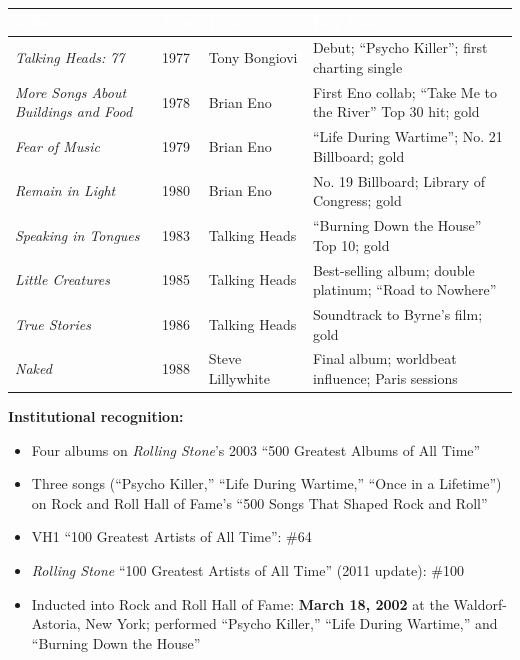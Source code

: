 \documentclass[11pt,letterpaper]{article}
\newcommand{\tableheader}[1]{\textbf{\sffamily\textcolor{white}{#1}}}
\begin{document}
\begin{center}
\begin{tabularx}{\textwidth}{L{4.2cm}C{1cm}L{3.5cm}X}
\toprule
{}
\tableheader{Album} & \tableheader{Year} & \tableheader{Producer(s)} & \tableheader{Key Notes} \\
\midrule
\textit{Talking Heads: 77} & 1977 & Tony Bongiovi & Debut; ``Psycho Killer''; first charting single \\
\textit{More Songs About Buildings and Food} & 1978 & Brian Eno & First Eno collab; ``Take Me to the River'' Top 30 hit; gold \\
\textit{Fear of Music} & 1979 & Brian Eno & ``Life During Wartime''; No. 21 Billboard; gold \\
\textit{Remain in Light} & 1980 & Brian Eno & No. 19 Billboard; Library of Congress; gold \\
\textit{Speaking in Tongues} & 1983 & Talking Heads & ``Burning Down the House'' Top 10; gold \\
\textit{Little Creatures} & 1985 & Talking Heads & Best-selling album; double platinum; ``Road to Nowhere'' \\
\textit{True Stories} & 1986 & Talking Heads & Soundtrack to Byrne's film; gold \\
\textit{Naked} & 1988 & Steve Lillywhite & Final album; worldbeat influence; Paris sessions \\
\bottomrule
\end{tabularx}
\end{center}

\textbf{Institutional recognition:}
\begin{itemize}[leftmargin=*]
  \item Four albums on \textit{Rolling Stone}'s 2003 ``500 Greatest Albums of All Time''
  \item Three songs (``Psycho Killer,'' ``Life During Wartime,'' ``Once in a Lifetime'') on Rock and Roll Hall of Fame's ``500 Songs That Shaped Rock and Roll''
  \item VH1 ``100 Greatest Artists of All Time'': \#64
  \item \textit{Rolling Stone} ``100 Greatest Artists of All Time'' (2011 update): \#100
  \item Inducted into Rock and Roll Hall of Fame: \textbf{March 18, 2002} at the Waldorf-Astoria, New York; performed ``Psycho Killer,'' ``Life During Wartime,'' and ``Burning Down the House''
\end{itemize}
\end{document}
